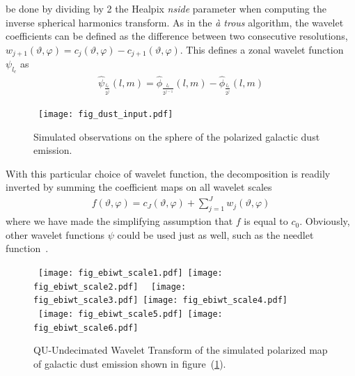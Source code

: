be done by dividing by 2 the Healpix {\it nside} parameter when computing the inverse spherical harmonics transform. 
As in the \emph{\`a trous} algorithm, the wavelet coefficients can be defined as the difference between two consecutive resolutions, 
$w_{j+1}(\vartheta, \varphi) = c_{j}(\vartheta, \varphi) - c_{j+1}(\vartheta, \varphi)$. This defines a zonal wavelet function $\psi_{l_c}$ as 
\begin{eqnarray}\label{wavelet}
\hat \psi_{\frac{l_c}{2^{j}}}(l,m) = \hat \phi_{\frac{l_c}{2^{j-1}}} (l,m)  - \hat \phi_{\frac{l_c}{2^{j}}}(l,m)
\end{eqnarray}

\begin{figure*}[htb]
\centerline{
\hbox{
 \texttt{[image: fig\_dust\_input.pdf]}
}}
\caption{Simulated observations on the sphere of the polarized galactic dust emission.}
\label{fig_simu_pol_dust}
\end{figure*}

With this particular choice of wavelet function, the decomposition is readily inverted by summing the coefficient maps on all wavelet scales
 \begin{eqnarray}\label{IWT}
   f(\vartheta, \varphi) = c_{J}(\vartheta, \varphi) + \sum_{j=1}^{J} w_j(\vartheta, \varphi)
\end{eqnarray}
where we have made the simplifying assumption that $f$ is equal to $c_0$. Obviously, other wavelet functions $\psi$ could be used just as well, such as the needlet function~\cite{marinucci08}.


\begin{figure*}[htb]
\centerline{
\vbox{
 \hbox{
 \texttt{[image: fig\_ebiwt\_scale1.pdf]}
 \texttt{[image: fig\_ebiwt\_scale2.pdf]}
 }
 \hbox{
 \texttt{[image: fig\_ebiwt\_scale3.pdf]}
 \texttt{[image: fig\_ebiwt\_scale4.pdf]}
 }
  \hbox{
 \texttt{[image: fig\_ebiwt\_scale5.pdf]}
 \texttt{[image: fig\_ebiwt\_scale6.pdf]}
 }
  }
 }
\caption{QU-Undecimated Wavelet Transform of the simulated polarized map of galactic dust emission shown in figure~(\ref{fig_simu_pol_dust}).}
\label{fig_quwt_trans_dust}
\end{figure*}

